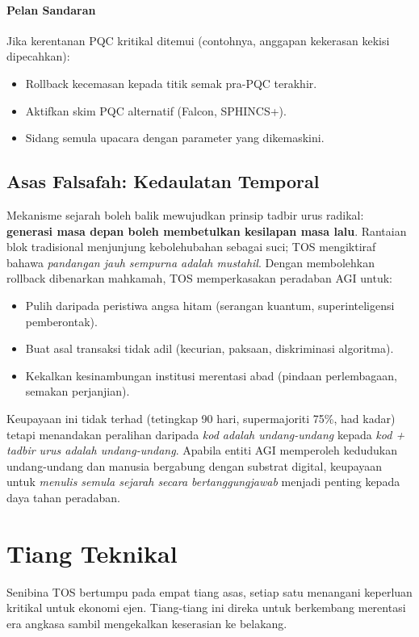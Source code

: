 \documentclass[11pt]{article}
\begin{document}
\paragraph{Pelan Sandaran}
Jika kerentanan PQC kritikal ditemui (contohnya, anggapan kekerasan kekisi dipecahkan):
\begin{itemize}[noitemsep]
  \item Rollback kecemasan kepada titik semak pra-PQC terakhir.
  \item Aktifkan skim PQC alternatif (Falcon, SPHINCS+).
  \item Sidang semula upacara dengan parameter yang dikemaskini.
\end{itemize}

\subsection{Asas Falsafah: Kedaulatan Temporal}

Mekanisme sejarah boleh balik mewujudkan prinsip tadbir urus radikal: \textbf{generasi masa depan boleh membetulkan kesilapan masa lalu}. Rantaian blok tradisional menjunjung kebolehubahan sebagai suci; TOS mengiktiraf bahawa \emph{pandangan jauh sempurna adalah mustahil}. Dengan membolehkan rollback dibenarkan mahkamah, TOS memperkasakan peradaban AGI untuk:
\begin{itemize}[noitemsep]
  \item Pulih daripada peristiwa angsa hitam (serangan kuantum, superinteligensi pemberontak).
  \item Buat asal transaksi tidak adil (kecurian, paksaan, diskriminasi algoritma).
  \item Kekalkan kesinambungan institusi merentasi abad (pindaan perlembagaan, semakan perjanjian).
\end{itemize}

Keupayaan ini tidak terhad (tetingkap 90 hari, supermajoriti 75\%, had kadar) tetapi menandakan peralihan daripada \emph{kod adalah undang-undang} kepada \emph{kod + tadbir urus adalah undang-undang}. Apabila entiti AGI memperoleh kedudukan undang-undang dan manusia bergabung dengan substrat digital, keupayaan untuk \emph{menulis semula sejarah secara bertanggungjawab} menjadi penting kepada daya tahan peradaban.

\section{Tiang Teknikal}

Senibina TOS bertumpu pada empat tiang asas, setiap satu menangani keperluan kritikal untuk ekonomi ejen. Tiang-tiang ini direka untuk berkembang merentasi era angkasa sambil mengekalkan keserasian ke belakang.
\end{document}
